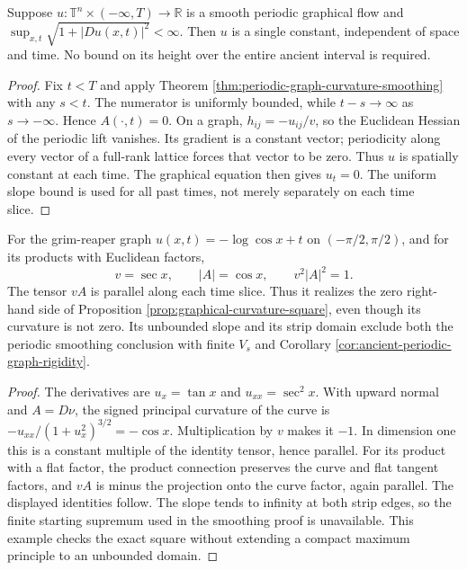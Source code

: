 \begin{corollary}\label{cor:ancient-periodic-graph-rigidity}
Suppose $u:\mathbb T^n\times(-\infty,T)\to\mathbb R$ is a smooth periodic graphical flow and
$\sup_{x,t}\sqrt{1+|Du(x,t)|^2}<\infty$.
Then $u$ is a single constant, independent of space and time. No bound on its height over the entire ancient interval is required.
\end{corollary}
\begin{proof}
Fix $t<T$ and apply Theorem \ref{thm:periodic-graph-curvature-smoothing} with any $s<t$. The numerator is uniformly bounded, while $t-s\to\infty$ as $s\to-\infty$. Hence $A(\cdot,t)=0$. On a graph, $h_{ij}=-u_{ij}/v$, so the Euclidean Hessian of the periodic lift vanishes. Its gradient is a constant vector; periodicity along every vector of a full-rank lattice forces that vector to be zero. Thus $u$ is spatially constant at each time. The graphical equation then gives $u_t=0$. The uniform slope bound is used for all past times, not merely separately on each time slice.
\end{proof}

\begin{example}\label{ex:grim-slope-curvature-identity}
For the grim-reaper graph $u(x,t)=-\log\cos x+t$ on $(-\pi/2,\pi/2)$, and for its products with Euclidean factors,
\[
 v=\sec x,\qquad |A|=\cos x,\qquad v^2|A|^2=1.
\]
The tensor $vA$ is parallel along each time slice. Thus it realizes the zero right-hand side of Proposition \ref{prop:graphical-curvature-square}, even though its curvature is not zero. Its unbounded slope and its strip domain exclude both the periodic smoothing conclusion with finite $V_s$ and Corollary \ref{cor:ancient-periodic-graph-rigidity}.
\end{example}
\begin{proof}
The derivatives are $u_x=\tan x$ and $u_{xx}=\sec^2x$. With upward normal and $A=D\nu$, the signed principal curvature of the curve is $-u_{xx}/(1+u_x^2)^{3/2}=-\cos x$. Multiplication by $v$ makes it $-1$. In dimension one this is a constant multiple of the identity tensor, hence parallel. For its product with a flat factor, the product connection preserves the curve and flat tangent factors, and $vA$ is minus the projection onto the curve factor, again parallel. The displayed identities follow. The slope tends to infinity at both strip edges, so the finite starting supremum used in the smoothing proof is unavailable. This example checks the exact square without extending a compact maximum principle to an unbounded domain.
\end{proof}
